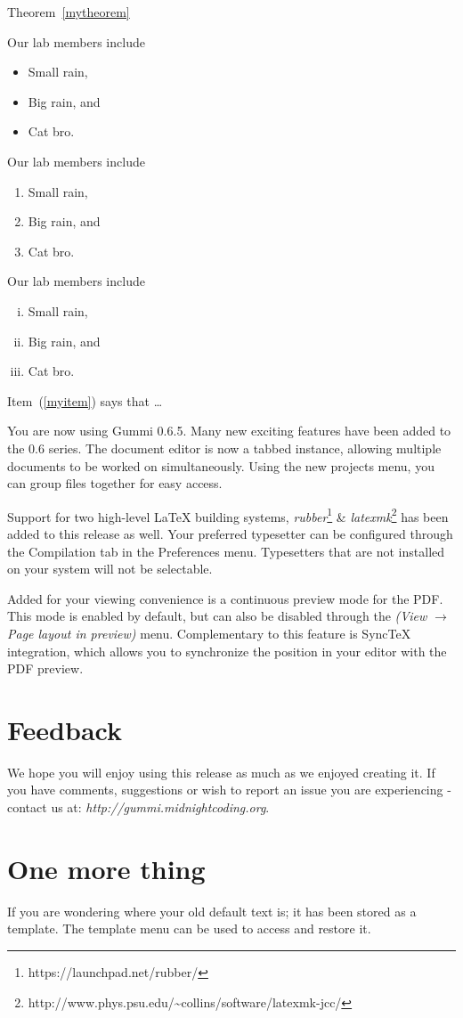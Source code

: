 \documentclass[12pt]{article}
\begin{document}
Theorem~\ref{mytheorem}

Our lab members include
\begin{itemize}
\item Small rain,
\item Big rain, and
\item Cat bro.
\end{itemize}


Our lab members include
\begin{enumerate}
\item Small rain,
\item Big rain, and
\item Cat bro.
\end{enumerate}

Our lab members include
\begin{enumerate}[(i)]
\item\label{myitem} Small rain,
\item Big rain, and
\item Cat bro.
\end{enumerate}

Item~(\ref{myitem}) says that \ldots


You are now using Gummi 0.6.5. Many new exciting features have been added to the 0.6 series. The document editor is now a tabbed instance, allowing multiple documents to be worked on simultaneously. Using the new projects menu, you can group files together for easy access. 

Support for two high-level {\LaTeX} building systems, \emph{rubber}\footnote{https://launchpad.net/rubber/} \& \emph{latexmk}\footnote{http://www.phys.psu.edu/{\textasciitilde}collins/software/latexmk-jcc/} has been added to this release as well. Your preferred typesetter can be configured through the Compilation tab in the Preferences menu. Typesetters that are not installed on your system will not be selectable. 

Added for your viewing convenience is a continuous preview mode for the PDF. This mode is enabled by default, but can also be disabled through the \emph{(View $\rightarrow$ Page layout in preview)} menu. Complementary to this feature is SyncTeX integration, which allows you to synchronize the position in your editor with the PDF preview. 

\section{Feedback}
We hope you will enjoy using this release as much as we enjoyed creating it. If you have comments, suggestions or wish to report an issue you are experiencing - contact us at: \emph{http://gummi.midnightcoding.org}.

\section{One more thing}
If you are wondering where your old default text is; it has been stored as a template. The template menu can be used to access and restore it. 
\end{document}
